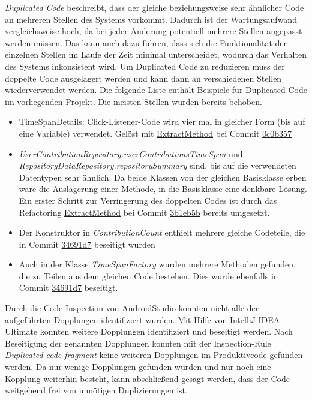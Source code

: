\textit{Duplicated Code} beschreibt, dass der gleiche beziehungsweise sehr ähnlicher Code an mehreren Stellen des Systems vorkommt.
Dadurch ist der Wartungsaufwand vergleichsweise hoch, da bei jeder Änderung potentiell mehrere Stellen angepasst werden müssen. Das kann auch dazu führen, dass sich die Funktionalität der einzelnen Stellen im Laufe der Zeit minimal unterscheidet, wodurch das Verhalten des Systems inkonsistent wird.
Um Duplicated Code zu reduzieren muss der doppelte Code ausgelagert werden und kann dann an verschiedenen Stellen wiederverwendet werden.
Die folgende Liste enthält Beispiele für Duplicated Code im vorliegenden Projekt.
Die meisten Stellen wurden bereits behoben.
\begin{itemize}
	\item{TimeSpanDetails: Click-Listener-Code wird vier mal in gleicher Form (bis auf eine Variable) verwendet. Gelöst mit {\hyperref[sec:ExtractMethod_TimeSpanDetails]{ExtractMethod}} bei Commit \href{https://github.com/lukaspanni/OpenSourceStats/commit/0c0b357dee742575d8465ae26e64152bfecbf5ab} {0c0b357}}
	
	\item{\textit{UserContributionRepository.userContributionsTimeSpan} und \textit{RepositoryDataRepository.repositorySummary} sind, bis auf die verwendeten Datentypen sehr ähnlich. 
Da beide Klassen von der gleichen Basisklasse erben wäre die Auslagerung einer Methode, in die Basisklasse eine denkbare Lösung.
\newline
Ein erster Schritt zur Verringerung des doppelten Codes ist durch das Refactoring {\hyperref[sec:ExtractMethod_Repository]{ExtractMethod}} bei Commit \href{https://github.com/lukaspanni/OpenSourceStats/commit/3b1eb5bf6750c3ccaeb05962ec8a8ae743adbf2c} {3b1eb5b} bereits umgesetzt.} 		
  \item{Der Konstruktor in \textit{ContributionCount} enthielt mehrere gleiche Codeteile, die in Commit \href{https://github.com/lukaspanni/OpenSourceStats/commit/34691d7b3b4bf00c483ce5c99d8e412f2732b6b1} {34691d7} beseitigt wurden}
  
  \item {Auch in der Klasse \textit{TimeSpanFactory} wurden mehrere Methoden gefunden, die zu Teilen aus dem gleichen Code bestehen. Dies wurde ebenfalls in Commit \href{https://github.com/lukaspanni/OpenSourceStats/commit/34691d7b3b4bf00c483ce5c99d8e412f2732b6b1} {34691d7} beseitigt.}
\end{itemize}
Durch die Code-Inspection von AndroidStudio konnten nicht alle der aufgeführten Dopplungen identifiziert wurden.
Mit Hilfe von IntelliJ IDEA Ultimate konnten weitere Dopplungen identifiziert und beseitigt werden.
Nach Beseitigung der genannten Dopplungen konnten mit der Inspection-Rule \textit{Duplicated code fragment} keine weiteren Dopplungen im Produktivcode gefunden werden.
Da nur wenige Dopplungen gefunden wurden und nur noch eine Kopplung weiterhin besteht, kann abschließend gesagt werden, dass der Code weitgehend frei von unnötigen Duplizierungen ist.

